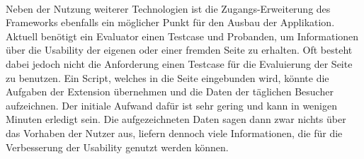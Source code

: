 \\
Neben der Nutzung weiterer Technologien ist die Zugangs-Erweiterung des Frameworks ebenfalls ein möglicher Punkt für den Ausbau der Applikation. Aktuell benötigt ein Evaluator einen Testcase und Probanden, um Informationen über die Usability der eigenen oder einer fremden Seite zu erhalten. Oft besteht dabei jedoch nicht die Anforderung einen Testcase für die Evaluierung der Seite zu benutzen. Ein Script, welches in die Seite eingebunden wird, könnte die Aufgaben der Extension übernehmen und die Daten der täglichen Besucher aufzeichnen. Der initiale Aufwand dafür ist sehr gering und kann in wenigen Minuten erledigt sein. Die aufgezeichneten Daten sagen dann zwar nichts über das Vorhaben der Nutzer aus, liefern dennoch viele Informationen, die für die Verbesserung der Usability genutzt werden können.